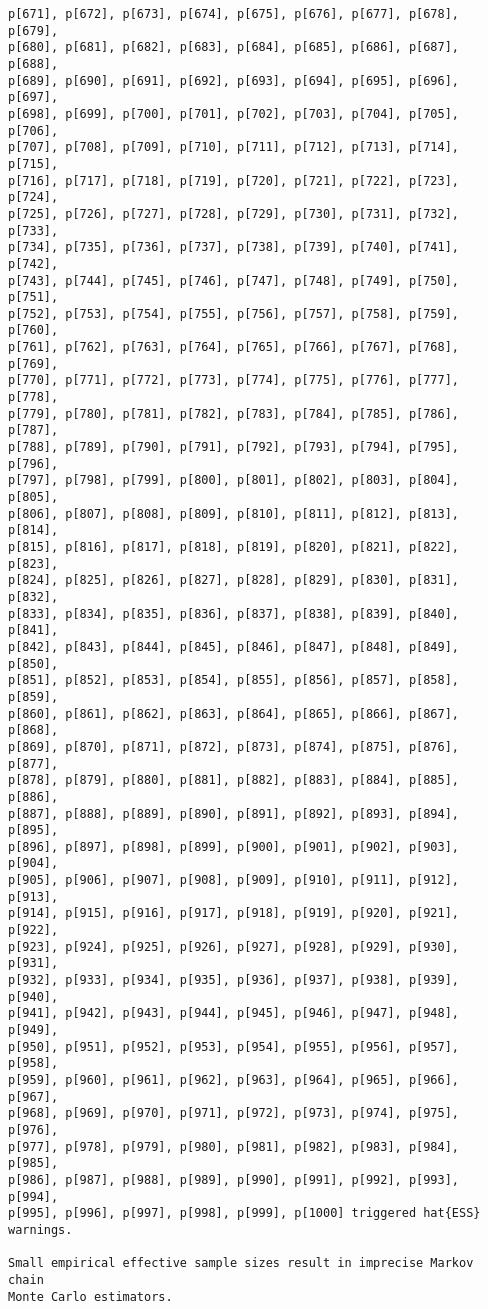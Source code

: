 \documentclass[
  letterpaper,
  DIV=11,
  numbers=noendperiod]{scrartcl}
\begin{document}
\begin{verbatim}
p[671], p[672], p[673], p[674], p[675], p[676], p[677], p[678], p[679],
p[680], p[681], p[682], p[683], p[684], p[685], p[686], p[687], p[688],
p[689], p[690], p[691], p[692], p[693], p[694], p[695], p[696], p[697],
p[698], p[699], p[700], p[701], p[702], p[703], p[704], p[705], p[706],
p[707], p[708], p[709], p[710], p[711], p[712], p[713], p[714], p[715],
p[716], p[717], p[718], p[719], p[720], p[721], p[722], p[723], p[724],
p[725], p[726], p[727], p[728], p[729], p[730], p[731], p[732], p[733],
p[734], p[735], p[736], p[737], p[738], p[739], p[740], p[741], p[742],
p[743], p[744], p[745], p[746], p[747], p[748], p[749], p[750], p[751],
p[752], p[753], p[754], p[755], p[756], p[757], p[758], p[759], p[760],
p[761], p[762], p[763], p[764], p[765], p[766], p[767], p[768], p[769],
p[770], p[771], p[772], p[773], p[774], p[775], p[776], p[777], p[778],
p[779], p[780], p[781], p[782], p[783], p[784], p[785], p[786], p[787],
p[788], p[789], p[790], p[791], p[792], p[793], p[794], p[795], p[796],
p[797], p[798], p[799], p[800], p[801], p[802], p[803], p[804], p[805],
p[806], p[807], p[808], p[809], p[810], p[811], p[812], p[813], p[814],
p[815], p[816], p[817], p[818], p[819], p[820], p[821], p[822], p[823],
p[824], p[825], p[826], p[827], p[828], p[829], p[830], p[831], p[832],
p[833], p[834], p[835], p[836], p[837], p[838], p[839], p[840], p[841],
p[842], p[843], p[844], p[845], p[846], p[847], p[848], p[849], p[850],
p[851], p[852], p[853], p[854], p[855], p[856], p[857], p[858], p[859],
p[860], p[861], p[862], p[863], p[864], p[865], p[866], p[867], p[868],
p[869], p[870], p[871], p[872], p[873], p[874], p[875], p[876], p[877],
p[878], p[879], p[880], p[881], p[882], p[883], p[884], p[885], p[886],
p[887], p[888], p[889], p[890], p[891], p[892], p[893], p[894], p[895],
p[896], p[897], p[898], p[899], p[900], p[901], p[902], p[903], p[904],
p[905], p[906], p[907], p[908], p[909], p[910], p[911], p[912], p[913],
p[914], p[915], p[916], p[917], p[918], p[919], p[920], p[921], p[922],
p[923], p[924], p[925], p[926], p[927], p[928], p[929], p[930], p[931],
p[932], p[933], p[934], p[935], p[936], p[937], p[938], p[939], p[940],
p[941], p[942], p[943], p[944], p[945], p[946], p[947], p[948], p[949],
p[950], p[951], p[952], p[953], p[954], p[955], p[956], p[957], p[958],
p[959], p[960], p[961], p[962], p[963], p[964], p[965], p[966], p[967],
p[968], p[969], p[970], p[971], p[972], p[973], p[974], p[975], p[976],
p[977], p[978], p[979], p[980], p[981], p[982], p[983], p[984], p[985],
p[986], p[987], p[988], p[989], p[990], p[991], p[992], p[993], p[994],
p[995], p[996], p[997], p[998], p[999], p[1000] triggered hat{ESS}
warnings.

Small empirical effective sample sizes result in imprecise Markov chain
Monte Carlo estimators.
\end{verbatim}
\end{document}
